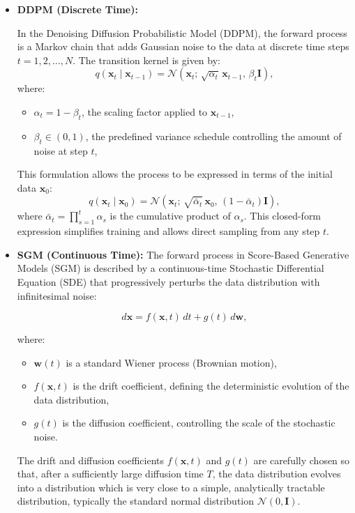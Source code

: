 \begin{itemize}
    \item \textbf{DDPM (Discrete Time):}
    
    In the Denoising Diffusion Probabilistic Model (DDPM), the forward process is a Markov chain that adds Gaussian noise to the data at discrete time steps \( t = 1, 2, \dots, N \). The transition kernel is given by:
    \[
    q(\mathbf{x}_t \mid \mathbf{x}_{t-1}) = \mathcal{N}\left(\mathbf{x}_t;\, \sqrt{\alpha_t} \, \mathbf{x}_{t-1},\, \beta_t \mathbf{I}\right),
    \]
    where:
    \begin{itemize}
        \item \( \alpha_t = 1 - \beta_t \), the scaling factor applied to \( \mathbf{x}_{t-1} \),
        \item \( \beta_t \in (0, 1) \), the predefined variance schedule controlling the amount of noise at step \( t \),
    \end{itemize}
    This formulation allows the process to be expressed in terms of the initial data \( \mathbf{x}_0 \):
    \[
    q(\mathbf{x}_t \mid \mathbf{x}_0) = \mathcal{N}\left(\mathbf{x}_t;\, \sqrt{\bar{\alpha}_t} \, \mathbf{x}_0,\, (1 - \bar{\alpha}_t) \mathbf{I}\right),
    \]
    where \( \bar{\alpha}_t = \prod_{s=1}^t \alpha_s \) is the cumulative product of \( \alpha_s \). This closed-form expression simplifies training and allows direct sampling from any step \( t \).

    \item \textbf{SGM (Continuous Time):} The forward process in Score-Based Generative Models (SGM) is described by a continuous-time Stochastic Differential Equation (SDE) that progressively perturbs the data distribution with infinitesimal noise:

    \[
    d\mathbf{x} = f(\mathbf{x}, t) \, dt + g(t) \, d\mathbf{w},
    \]
    
    where:
    \begin{itemize}
        \item \( \mathbf{w}(t) \) is a standard Wiener process (Brownian motion),
        \item \( f(\mathbf{x}, t) \) is the drift coefficient, defining the deterministic evolution of the data distribution,
        \item \( g(t) \) is the diffusion coefficient, controlling the scale of the stochastic noise.
    \end{itemize}
    
    The drift and diffusion coefficients \( f(\mathbf{x}, t) \) and \( g(t) \) are carefully chosen so that, after a sufficiently large diffusion time \( T \), the data distribution evolves into a distribution which is very close to a simple, analytically tractable distribution, typically the standard normal distribution \( \mathcal{N}(0, \mathbf{I}) \).
    

\end{itemize}
